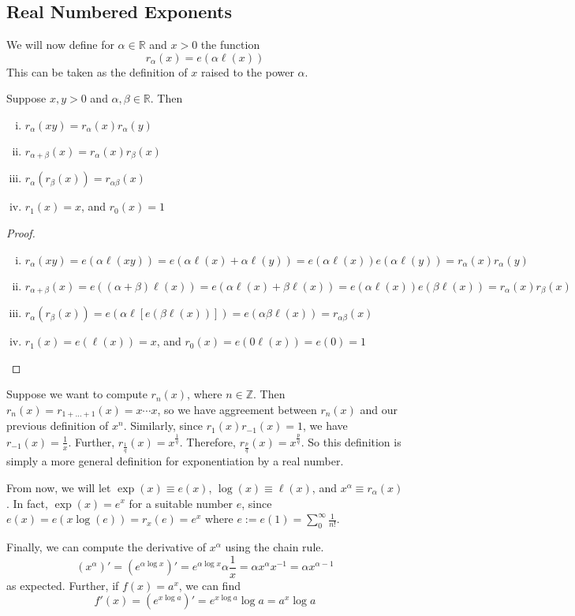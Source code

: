 \subsection{Real Numbered Exponents}
We will now define for \(\alpha \in \mathbb R\) and \(x > 0\) the function
\[
	r_\alpha(x) = e(\alpha \ell(x))
\]
This can be taken as the definition of \(x\) raised to the power \(\alpha\).
\begin{theorem}
	Suppose \(x, y > 0\) and \(\alpha, \beta \in \mathbb R\).
	Then
	\begin{enumerate}[(i)]
		\item \(r_\alpha(xy) = r_\alpha(x)r_\alpha(y)\)
		\item \(r_{\alpha + \beta}(x) = r_\alpha(x) r_\beta(x)\)
		\item \(r_\alpha(r_\beta(x)) = r_{\alpha\beta}(x)\)
		\item \(r_1(x) = x\), and \(r_0(x) = 1\)
	\end{enumerate}
\end{theorem}
\begin{proof}
	\begin{enumerate}[(i)]
		\item \(r_\alpha(xy) = e(\alpha \ell(xy)) = e(\alpha \ell(x) + \alpha \ell(y)) = e(\alpha \ell(x))e(\alpha\ell(y)) = r_\alpha(x)r_\alpha(y)\)
		\item \(r_{\alpha + \beta}(x) = e((\alpha + \beta) \ell(x)) = e(\alpha\ell(x) + \beta\ell(x)) = e(\alpha\ell(x))e(\beta\ell(x)) = r_\alpha(x) r_\beta(x)\)
		\item \(r_\alpha(r_\beta(x)) = e(\alpha \ell[e(\beta \ell(x))]) = e(\alpha \beta \ell(x)) = r_{\alpha\beta}(x)\)
		\item \(r_1(x) = e(\ell(x)) = x\), and \(r_0(x) = e(0 \ell(x)) = e(0) = 1\)
	\end{enumerate}
\end{proof}
\noindent Suppose we want to compute \(r_n(x)\), where \(n \in\mathbb Z\).
Then \(r_n(x) = r_{1 + \dots + 1}(x) = x \cdots x\), so we have aggreement between \(r_n(x)\) and our previous definition of \(x^n\).
Similarly, since \(r_1(x) r_{-1}(x) = 1\), we have \(r_{-1}(x) = \frac{1}{x}\).
Further, \(r_{\frac{1}{q}}(x) = x^\frac{1}{q}\).
Therefore, \(r_{\frac{p}{q}}(x) = x^{\frac{p}{q}}\).
So this definition is simply a more general definition for exponentiation by a real number.

From now, we will let \(\exp(x) \equiv e(x)\), \(\log(x) \equiv \ell(x)\), and \(x^\alpha \equiv r_\alpha(x)\).
In fact, \(\exp(x) = e^x\) for a suitable number \(e\), since \(e(x) = e(x \log(e)) = r_x(e) = e^x\) where \(e := e(1) = \sum_0^\infty \frac{1}{n!}\).

Finally, we can compute the derivative of \(x^\alpha\) using the chain rule.
\[
	(x^\alpha)' = \left( e^{\alpha \log x} \right)' = e^{\alpha \log x} \alpha \frac{1}{x} = \alpha x^\alpha x^{-1} = \alpha x^{\alpha - 1}
\]
as expected.
Further, if \(f(x) = a^x\), we can find
\[
	f'(x) = \left( e^{x \log a} \right)' = e^{x \log a} \log a = a^x \log a
\]
